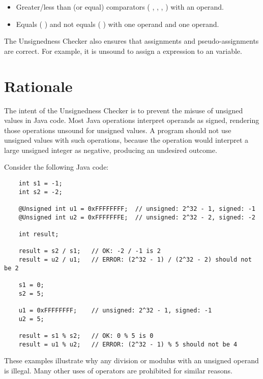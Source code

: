 \begin{itemize}

    \item   
    Greater/less than (or equal) comparators
    ( \code{<}, \code{<=}, \code{>}, \code{>=} ) with an 
    operand.
    \item   
    Equals ( \code{==} ) and not equals ( \code{!=} ) with one 
    operand and one  operand.

\end{itemize}

The Unsignedness Checker also ensures that assignments and pseudo-assignments are
correct. For example, it is unsound to assign a  expression to an
 variable.

\section{Rationale\label{unsignedness-checker-rationale}}

The intent of the Unsignedness Checker is to prevent the misuse of unsigned
values in Java code.  Most Java operations interpret operands as signed,
rendering those operations unsound for unsigned values. A program should not use
unsigned values with such operations, because the operation would interpret a
large unsigned integer as negative, producing an undesired outcome.

Consider the following Java code:

\begin{Verbatim}
    int s1 = -1;
    int s2 = -2;

    @Unsigned int u1 = 0xFFFFFFFF;  // unsigned: 2^32 - 1, signed: -1
    @Unsigned int u2 = 0xFFFFFFFE;  // unsigned: 2^32 - 2, signed: -2

    int result;

    result = s2 / s1;   // OK: -2 / -1 is 2
    result = u2 / u1;   // ERROR: (2^32 - 1) / (2^32 - 2) should not be 2

    s1 = 0;
    s2 = 5;

    u1 = 0xFFFFFFFF;    // unsigned: 2^32 - 1, signed: -1
    u2 = 5;

    result = s1 % s2;   // OK: 0 % 5 is 0
    result = u1 % u2;   // ERROR: (2^32 - 1) % 5 should not be 4
\end{Verbatim}

These examples illustrate why any division or modulus with an unsigned operand 
is illegal. Many other uses of operators are prohibited for similar reasons.
